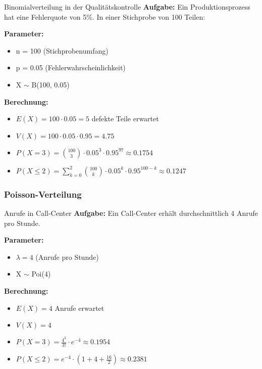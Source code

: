 \begin{example2}{Binomialverteilung in der Qualitätskontrolle}
\textbf{Aufgabe:} Ein Produktionsprozess hat eine Fehlerquote von 5\%. In einer Stichprobe von 100 Teilen:

\textbf{Parameter:}
\begin{itemize}
\item n = 100 (Stichprobenumfang)
\item p = 0.05 (Fehlerwahrscheinlichkeit)
\item X $\sim$  B(100, 0.05)
\end{itemize}

\textbf{Berechnung:}
\begin{itemize}
\item $E(X) = 100 \cdot 0.05 = 5$ defekte Teile erwartet
\item $V(X) = 100 \cdot 0.05 \cdot 0.95 = 4.75$
\item $P(X=3) = \binom{100}{3} \cdot 0.05^3 \cdot 0.95^{97} \approx 0.1754$
\item $P(X \leq 2) = \sum_{k=0}^2 \binom{100}{k} \cdot 0.05^k \cdot 0.95^{100-k} \approx 0.1247$
\end{itemize}
\end{example2}

\subsubsection{Poisson-Verteilung}

\begin{example2}{Anrufe in Call-Center}
\textbf{Aufgabe:} Ein Call-Center erhält durchschnittlich 4 Anrufe pro Stunde.

\textbf{Parameter:}
\begin{itemize}
\item $\lambda = 4$ (Anrufe pro Stunde)
\item X $\sim$ Poi(4)
\end{itemize}

\textbf{Berechnung:}
\begin{itemize}
\item $E(X) = 4$ Anrufe erwartet
\item $V(X) = 4$
\item $P(X=3) = \frac{4^3}{3!} \cdot e^{-4} \approx 0.1954$
\item $P(X \leq 2) = e^{-4} \cdot (1 + 4 + \frac{16}{2}) \approx 0.2381$
\end{itemize}
\end{example2}

